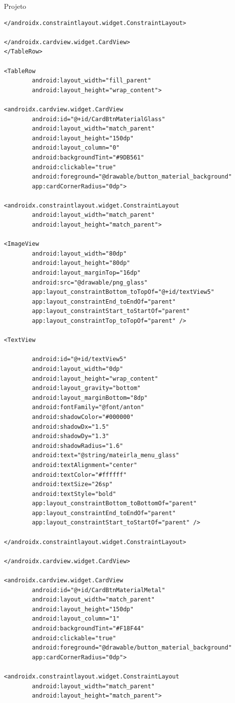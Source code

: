 \documentclass[
	12pt,				%
	openright,			%
	twoside,			%
	a4paper,			%
	english,			%
	french,				%
	spanish,			%
	brazil				%
	]{abntex2}
\begin{document}
\begin{chapter}{Projeto}
\begin{lstlisting}[numbers=none,basicstyle=\small,
caption={FragmentMaterialMenu.xml},
title={FragmentMaterialMenu.xml},
label={fragment_material_menu.xml}]
</androidx.constraintlayout.widget.ConstraintLayout>

</androidx.cardview.widget.CardView>
</TableRow>

<TableRow
		android:layout_width="fill_parent"
		android:layout_height="wrap_content">

<androidx.cardview.widget.CardView
		android:id="@+id/CardBtnMaterialGlass"
		android:layout_width="match_parent"
		android:layout_height="150dp"
		android:layout_column="0"
		android:backgroundTint="#9DB561"
		android:clickable="true"
		android:foreground="@drawable/button_material_background"
		app:cardCornerRadius="0dp">

<androidx.constraintlayout.widget.ConstraintLayout
		android:layout_width="match_parent"
		android:layout_height="match_parent">

<ImageView
		android:layout_width="80dp"
		android:layout_height="80dp"
		android:layout_marginTop="16dp"
		android:src="@drawable/png_glass"
		app:layout_constraintBottom_toTopOf="@+id/textView5"
		app:layout_constraintEnd_toEndOf="parent"
		app:layout_constraintStart_toStartOf="parent"
		app:layout_constraintTop_toTopOf="parent" />

<TextView

		android:id="@+id/textView5"
		android:layout_width="0dp"
		android:layout_height="wrap_content"
		android:layout_gravity="bottom"
		android:layout_marginBottom="8dp"
		android:fontFamily="@font/anton"
		android:shadowColor="#000000"
		android:shadowDx="1.5"
		android:shadowDy="1.3"
		android:shadowRadius="1.6"
		android:text="@string/mateirla_menu_glass"
		android:textAlignment="center"
		android:textColor="#ffffff"
		android:textSize="26sp"
		android:textStyle="bold"
		app:layout_constraintBottom_toBottomOf="parent"
		app:layout_constraintEnd_toEndOf="parent"
		app:layout_constraintStart_toStartOf="parent" />

</androidx.constraintlayout.widget.ConstraintLayout>

</androidx.cardview.widget.CardView>

<androidx.cardview.widget.CardView
		android:id="@+id/CardBtnMaterialMetal"
		android:layout_width="match_parent"
		android:layout_height="150dp"
		android:layout_column="1"
		android:backgroundTint="#F18F44"
		android:clickable="true"
		android:foreground="@drawable/button_material_background"
		app:cardCornerRadius="0dp">

<androidx.constraintlayout.widget.ConstraintLayout
		android:layout_width="match_parent"
		android:layout_height="match_parent">


\end{lstlisting}
\end{chapter}
\end{document}
